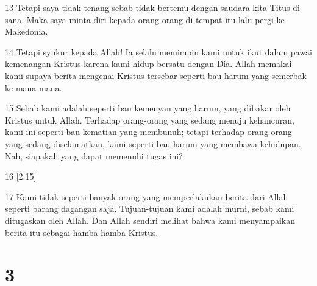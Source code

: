 \par 13 Tetapi saya tidak tenang sebab tidak bertemu dengan saudara kita Titus di sana. Maka saya minta diri kepada orang-orang di tempat itu lalu pergi ke Makedonia.
\par 14 Tetapi syukur kepada Allah! Ia selalu memimpin kami untuk ikut dalam pawai kemenangan Kristus karena kami hidup bersatu dengan Dia. Allah memakai kami supaya berita mengenai Kristus tersebar seperti bau harum yang semerbak ke mana-mana.
\par 15 Sebab kami adalah seperti bau kemenyan yang harum, yang dibakar oleh Kristus untuk Allah. Terhadap orang-orang yang sedang menuju kehancuran, kami ini seperti bau kematian yang membunuh; tetapi terhadap orang-orang yang sedang diselamatkan, kami seperti bau harum yang membawa kehidupan. Nah, siapakah yang dapat memenuhi tugas ini?
\par 16 [2:15]
\par 17 Kami tidak seperti banyak orang yang memperlakukan berita dari Allah seperti barang dagangan saja. Tujuan-tujuan kami adalah murni, sebab kami ditugaskan oleh Allah. Dan Allah sendiri melihat bahwa kami menyampaikan berita itu sebagai hamba-hamba Kristus.

\chapter{3}

